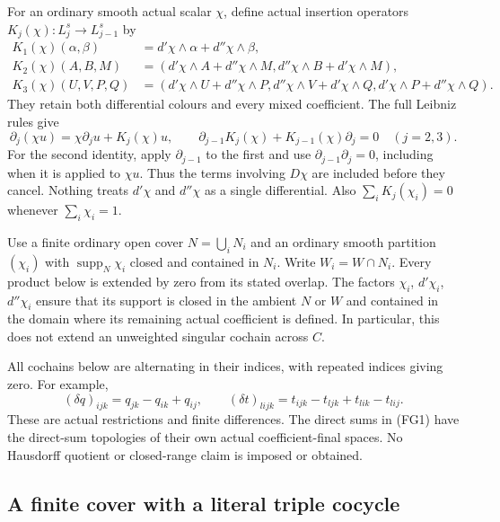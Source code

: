For an ordinary smooth actual scalar $\chi$, define actual
insertion operators $K_j(\chi):L_j^s\longrightarrow L_{j-1}^s$ by
\[
\begin{split}
 K_1(\chi)(\alpha,\beta)
       & =d'\chi\wedge\alpha+d''\chi\wedge\beta,\\
 K_2(\chi)(A,B,M)
       & =(d'\chi\wedge A+d''\chi\wedge M,
                         d''\chi\wedge B+d'\chi\wedge M),\\
 K_3(\chi)(U,V,P,Q)
       & =(d'\chi\wedge U+d''\chi\wedge P,
          d''\chi\wedge V+d'\chi\wedge Q,
          d'\chi\wedge P+d''\chi\wedge Q).
\end{split}                                                    \tag{FG3}
\]
They retain both differential colours and every mixed coefficient.
The full Leibniz rules give
\[
 \partial_j(\chi u)=\chi\partial_j u+K_j(\chi)u,
 \qquad
 \partial_{j-1}K_j(\chi)+K_{j-1}(\chi)\partial_j=0
                                     \quad(j=2,3).             \tag{FG4}
\]
For the second identity, apply $\partial_{j-1}$ to the first and
use $\partial_{j-1}\partial_j=0$, including when it is applied to
$\chi u$.  Thus the terms involving $D\chi$ are included before
they cancel.  Nothing treats $d'\chi$ and $d''\chi$ as a single
differential.  Also $\sum_i K_j(\chi_i)=0$ whenever $\sum_i\chi_i=1$.

Use a finite ordinary open cover $N=\bigcup_iN_i$ and an ordinary
smooth partition $(\chi_i)$ with $\operatorname{supp}_N\chi_i$
closed and contained in $N_i$.  Write $W_i=W\cap N_i$.
Every product below is extended by zero from its stated overlap.
The factors $\chi_i$, $d'\chi_i$, $d''\chi_i$ ensure that its support
is closed in the ambient $N$ or $W$ and contained in the domain
where its remaining actual coefficient is defined.  In particular,
this does not extend an unweighted singular cochain across $C$.

All cochains below are alternating in their indices, with repeated
indices giving zero.  For example,
\[
 (\delta q)_{ijk}=q_{jk}-q_{ik}+q_{ij},\qquad
 (\delta t)_{lijk}=t_{ijk}-t_{ljk}+t_{lik}-t_{lij}.               \tag{FG5}
\]
These are actual restrictions and finite differences.  The direct
sums in (FG1) have the direct-sum topologies of their own actual
coefficient-final spaces.  No Hausdorff quotient or closed-range
claim is imposed or obtained.

\subsection{A finite cover with a literal triple cocycle}

